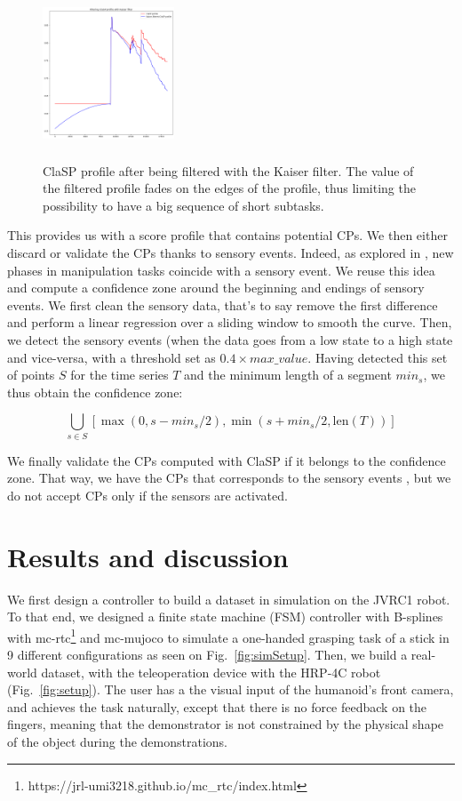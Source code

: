 \documentclass[conference]{IEEEtran}
\begin{document}
\begin{figure}[t]
  \centering
  \includegraphics[width=0.35\textwidth, height=2in]{img/resolKaiser.png}
  \caption{ClaSP profile after being filtered with the Kaiser filter. The value of the filtered profile fades on the edges of the profile, thus limiting the possibility to have a big sequence of short subtasks.}
  \label{fig:Kaiser}
\end{figure}

This provides us with a score profile that contains potential CPs. We then either discard or validate the CPs thanks to sensory events. Indeed, as explored in \cite{sensory_seg}, new phases in manipulation tasks coincide  with a sensory event. We reuse this idea and compute a confidence zone around the beginning and endings of sensory events. We first clean the sensory data, that's to say remove the first difference and perform a linear regression over a sliding window to smooth the curve. Then,  we detect the sensory events  (when the data goes from a low state to a high  state and vice-versa, with a threshold set as $0.4\times max\_value$. Having detected this set of points $S$ for the time series $T$ and the minimum length of a segment $min_s$, we thus obtain the confidence zone:

\begin{equation}
        \bigcup_{s \in S} \left[ \max(0, s - min_s/2),\min(s + min_s/2, \text{len}(T)) \right]
\end{equation}

We finally validate the CPs computed with ClaSP if it belongs to the confidence zone. That way, we have the CPs that corresponds to the sensory events , but we do not accept CPs only if the sensors are activated.

\section{Results and discussion} \label{results}

 We first design a controller to build a dataset in  simulation on the JVRC1 robot. To that end, we designed a finite state machine (FSM) controller with B-splines with mc-rtc\footnote{https://jrl-umi3218.github.io/mc\_rtc/index.html} and mc-mujoco\cite{singh2023mc} to simulate a one-handed grasping task of a stick in 9 different configurations as seen on Fig.~\ref{fig:simSetup}. Then, we build a real-world dataset, with the teleoperation device  with the HRP-4C robot (Fig.~\ref{fig:setup}). The user has a the visual input of the humanoid's front camera, and achieves the task naturally, except that there is no force  feedback on the fingers, meaning that the demonstrator is not constrained by the physical shape of the object during the demonstrations.
\end{document}
